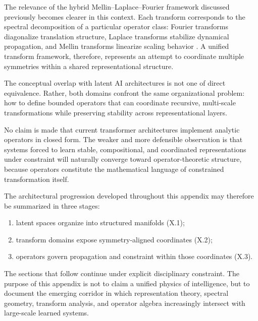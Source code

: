 The relevance of the hybrid Mellin--Laplace--Fourier framework discussed previously \cite{irwin2026mlf} becomes clearer in this context. Each transform corresponds to the spectral decomposition of a particular operator class: Fourier transforms diagonalize translation structure, Laplace transforms stabilize dynamical propagation, and Mellin transforms linearize scaling behavior \cite{stein1971introduction,titchmarsh1948introduction}. A unified transform framework, therefore, represents an attempt to coordinate multiple symmetries within a shared representational structure.

The conceptual overlap with latent AI architectures is not one of direct equivalence. Rather, both domains confront the same organizational problem: how to define bounded operators that can coordinate recursive, multi-scale transformations while preserving stability across representational layers.

No claim is made that current transformer architectures implement analytic operators in closed form. The weaker and more defensible observation is that systems forced to learn stable, compositional, and coordinated representations under constraint will naturally converge toward operator-theoretic structure, because operators constitute the mathematical language of constrained transformation itself.

The architectural progression developed throughout this appendix may therefore be summarized in three stages:

\begin{enumerate}
\item latent spaces organize into structured manifolds (X.1);
\item transform domains expose symmetry-aligned coordinates (X.2);
\item operators govern propagation and constraint within those coordinates (X.3).
\end{enumerate}

The sections that follow continue under explicit disciplinary constraint. The purpose of this appendix is not to claim a unified physics of intelligence, but to document the emerging corridor in which representation theory, spectral geometry, transform analysis, and operator algebra increasingly intersect with large-scale learned systems.

